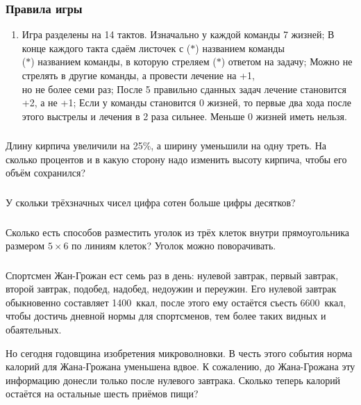 \documentclass[aspectratio=1610,12pt,notheorems]{beamer}
\newcounter{zadacha}
\newcommand\slprob{
	\frametitle{\thezadacha} \stepcounter{zadacha}
}
\begin{document}
\begin{frame} \frametitle{Правила игры}
\begin{enumerate}
	\item Игра разделены на 14 тактов. Изначально у каждой команды 7 жизней;
	\mitem В конце каждого такта сдаём листочек с ($*$) названием команды\\ ($*$) названием команды, в которую стреляем ($*$) ответом на задачу;
	\mitem Можно не стрелять в другие команды, а провести лечение на +1,\\ но не более семи раз;
	\mitem После 5 правильно сданных задач лечение становится +2, а не +1;
	\mitem Если у команды становится 0 жизней, то первые два хода после этого выстрелы и лечения в 2 раза сильнее. Меньше 0 жизней иметь нельзя.
\end{enumerate}
\end{frame}

\begin{frame} \slprob
	Длину кирпича увеличили на 25\%, а ширину уменьшили на одну треть. На сколько процентов и в какую сторону надо изменить высоту кирпича, чтобы его объём сохранился? 
\end{frame}

\begin{frame} \slprob
	У скольки трёхзначных чисел цифра сотен больше цифры десятков? 
\end{frame}

\begin{frame} \slprob
	Сколько есть способов разместить уголок из трёх клеток внутри прямоугольника размером $5 \times 6$ по линиям клеток? Уголок можно поворачивать.
\end{frame}

\begin{frame} \slprob
	Спортсмен Жан-Грожан ест семь раз в день: нулевой завтрак, первый завтрак, второй завтрак, подобед, надобед, недоужин и переужин. Его нулевой завтрак обыкновенно составляет 1400~ккал, после этого ему остаётся съесть 6600~ккал, чтобы достичь дневной нормы для спортсменов, тем более таких видных и обаятельных.

	Но сегодня годовщина изобретения микроволновки. В честь этого события норма калорий для Жана-Грожана уменьшена вдвое. К сожалению, до Жана-Грожана эту информацию донесли только после нулевого завтрака. Сколько теперь калорий остаётся на остальные шесть приёмов пищи?
\end{frame}
\end{document}
